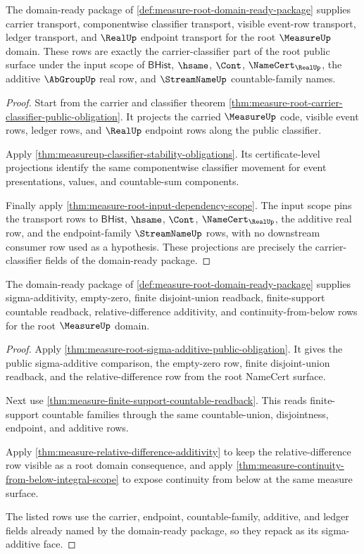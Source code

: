 \begin{theorem}
\label{thm:measure-root-domain-carrier-classifier-ready}
The domain-ready package of
\autoref{def:measure-root-domain-ready-package} supplies carrier transport,
componentwise classifier transport, visible event-row transport, ledger
transport, and $\RealUp$ endpoint transport for the root $\MeasureUp$ domain.
These rows are exactly the carrier-classifier part of the root public surface
under the input scope of $\mathsf{BHist}$, $\hsame$, $\Cont$,
$\NameCert_{\RealUp}$, the additive $\AbGroupUp$ real row, and
$\StreamNameUp$ countable-family names.
\end{theorem}
\begin{proof}
Start from the carrier and classifier theorem
\autoref{thm:measure-root-carrier-classifier-public-obligation}. It projects
the carried $\MeasureUp$ code, visible event rows, ledger rows, and $\RealUp$
endpoint rows along the public classifier.

Apply \autoref{thm:measureup-classifier-stability-obligations}. Its
certificate-level projections identify the same componentwise classifier
movement for event presentations, values, and countable-sum components.

Finally apply \autoref{thm:measure-root-input-dependency-scope}. The input
scope pins the transport rows to $\mathsf{BHist}$, $\hsame$, $\Cont$,
$\NameCert_{\RealUp}$, the additive real row, and the endpoint-family
$\StreamNameUp$ rows, with no downstream consumer row used as a hypothesis.
These projections are precisely the carrier-classifier fields of the
domain-ready package.
\end{proof}

\begin{theorem}
\label{thm:measure-root-domain-sigma-additive-ready}
The domain-ready package of
\autoref{def:measure-root-domain-ready-package} supplies sigma-additivity,
empty-zero, finite disjoint-union readback, finite-support countable
readback, relative-difference additivity, and continuity-from-below rows for
the root $\MeasureUp$ domain.
\end{theorem}
\begin{proof}
Apply \autoref{thm:measure-root-sigma-additive-public-obligation}. It gives
the public sigma-additive comparison, the empty-zero row, finite
disjoint-union readback, and the relative-difference row from the root
NameCert surface.

Next use \autoref{thm:measure-finite-support-countable-readback}. This reads
finite-support countable families through the same countable-union,
disjointness, endpoint, and additive rows.

Apply \autoref{thm:measure-relative-difference-additivity} to keep the
relative-difference row visible as a root domain consequence, and apply
\autoref{thm:measure-continuity-from-below-integral-scope} to expose
continuity from below at the same measure surface.

The listed rows use the carrier, endpoint, countable-family, additive, and
ledger fields already named by the domain-ready package, so they repack as
its sigma-additive face.
\end{proof}

